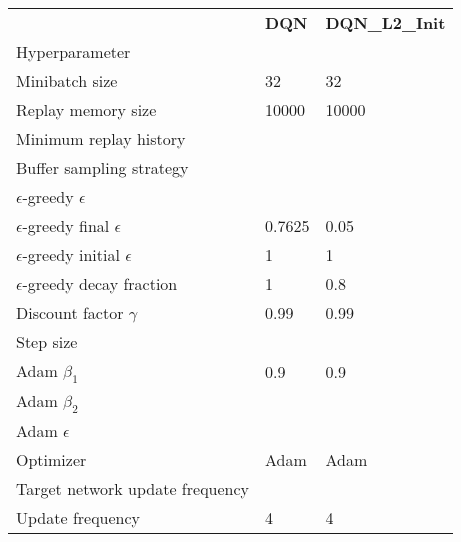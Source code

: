\begin{tabular}{lll}
 & \bfseries DQN & \bfseries DQN_L2_Init \\
Hyperparameter &  &  \\
Minibatch size & 32 & 32 \\
Replay memory size & 10000 & 10000 \\
Minimum replay history &  &  \\
Buffer sampling strategy &  &  \\
$\epsilon$-greedy $\epsilon$ &  &  \\
$\epsilon$-greedy final $\epsilon$ & 0.7625 & 0.05 \\
$\epsilon$-greedy initial $\epsilon$ & 1 & 1 \\
$\epsilon$-greedy decay fraction & 1 & 0.8 \\
Discount factor $\gamma$ & 0.99 & 0.99 \\
Step size &  &  \\
Adam $\beta_1$ & 0.9 & 0.9 \\
Adam $\beta_2$ &  &  \\
Adam $\epsilon$ &  &  \\
Optimizer & Adam & Adam \\
Target network update frequency &  &  \\
Update frequency & 4 & 4 \\
\end{tabular}
